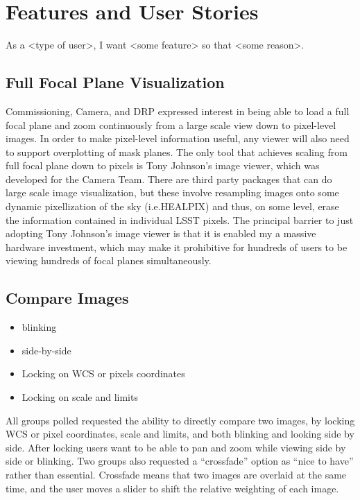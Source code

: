 \section{Features and User Stories}
\label{sec:features}

As a <type of user>, I want <some feature> so that <some reason>. 

\subsection{Full Focal Plane Visualization}

Commissioning, Camera, and DRP expressed interest in being able to load a full focal plane and zoom continuously
from a large scale view down to pixel-level images.  In order to make pixel-level information useful, any
viewer will also need to support overplotting of mask planes.
The only tool that achieves scaling from full focal plane down to pixels is Tony Johnson's image
viewer, which was developed for the Camera Team.  There are third party packages that can do large scale image
visualization, but these involve resampling images onto some dynamic pixellization of the sky (i.e.HEALPIX) and
thus, on some level, erase the information contained in individual LSST pixels.  The principal barrier to just
adopting Tony Johnson's image viewer is that it is enabled my a massive hardware investment, which may make it
prohibitive for hundreds of users to be viewing hundreds of focal planes simultaneously.

\subsection{Compare Images}
\begin{itemize}
\item{blinking}
\item{side-by-side}
\item{Locking on WCS or pixels coordinates}
\item{Locking on scale and limits}
\end{itemize}

All groups polled requested the ability to directly compare two images, by locking WCS or pixel coordinates, scale and limits, and both blinking and looking side by side.
After locking users want to be able to pan and zoom while viewing side by side or blinking.
Two groups also requested a ``crossfade'' option as ``nice to have'' rather than essential.
Crossfade means that two images are overlaid at the same time, and the user moves a slider to shift the relative weighting of each image.

